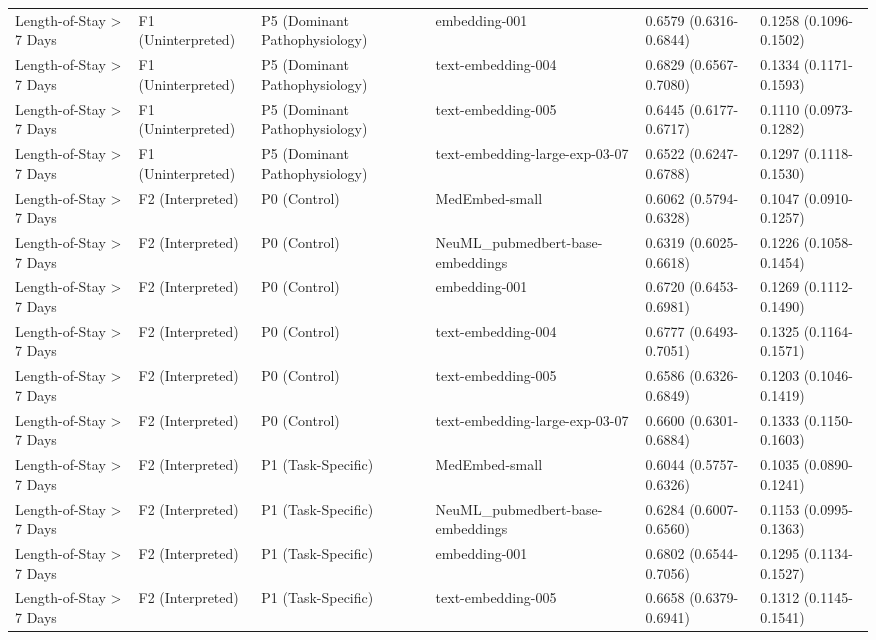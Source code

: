 \documentclass[border=0pt]{standalone}
\begin{document}
\begin{adjustbox}{width=\textwidth}
\begin{tabular}{llllll}
Length-of-Stay \textgreater{} 7 Days & F1 (Uninterpreted) & P5 (Dominant Pathophysiology) & embedding-001 & 0.6579 (0.6316-0.6844) & 0.1258 (0.1096-0.1502) \\
Length-of-Stay \textgreater{} 7 Days & F1 (Uninterpreted) & P5 (Dominant Pathophysiology) & text-embedding-004 & 0.6829 (0.6567-0.7080) & 0.1334 (0.1171-0.1593) \\
Length-of-Stay \textgreater{} 7 Days & F1 (Uninterpreted) & P5 (Dominant Pathophysiology) & text-embedding-005 & 0.6445 (0.6177-0.6717) & 0.1110 (0.0973-0.1282) \\
Length-of-Stay \textgreater{} 7 Days & F1 (Uninterpreted) & P5 (Dominant Pathophysiology) & text-embedding-large-exp-03-07 & 0.6522 (0.6247-0.6788) & 0.1297 (0.1118-0.1530) \\
Length-of-Stay \textgreater{} 7 Days & F2 (Interpreted) & P0 (Control) & MedEmbed-small & 0.6062 (0.5794-0.6328) & 0.1047 (0.0910-0.1257) \\
Length-of-Stay \textgreater{} 7 Days & F2 (Interpreted) & P0 (Control) & NeuML\_pubmedbert-base-embeddings & 0.6319 (0.6025-0.6618) & 0.1226 (0.1058-0.1454) \\
Length-of-Stay \textgreater{} 7 Days & F2 (Interpreted) & P0 (Control) & embedding-001 & 0.6720 (0.6453-0.6981) & 0.1269 (0.1112-0.1490) \\
Length-of-Stay \textgreater{} 7 Days & F2 (Interpreted) & P0 (Control) & text-embedding-004 & 0.6777 (0.6493-0.7051) & 0.1325 (0.1164-0.1571) \\
Length-of-Stay \textgreater{} 7 Days & F2 (Interpreted) & P0 (Control) & text-embedding-005 & 0.6586 (0.6326-0.6849) & 0.1203 (0.1046-0.1419) \\
Length-of-Stay \textgreater{} 7 Days & F2 (Interpreted) & P0 (Control) & text-embedding-large-exp-03-07 & 0.6600 (0.6301-0.6884) & 0.1333 (0.1150-0.1603) \\
Length-of-Stay \textgreater{} 7 Days & F2 (Interpreted) & P1 (Task-Specific) & MedEmbed-small & 0.6044 (0.5757-0.6326) & 0.1035 (0.0890-0.1241) \\
Length-of-Stay \textgreater{} 7 Days & F2 (Interpreted) & P1 (Task-Specific) & NeuML\_pubmedbert-base-embeddings & 0.6284 (0.6007-0.6560) & 0.1153 (0.0995-0.1363) \\
Length-of-Stay \textgreater{} 7 Days & F2 (Interpreted) & P1 (Task-Specific) & embedding-001 & 0.6802 (0.6544-0.7056) & 0.1295 (0.1134-0.1527) \\
Length-of-Stay \textgreater{} 7 Days & F2 (Interpreted) & P1 (Task-Specific) & text-embedding-005 & 0.6658 (0.6379-0.6941) & 0.1312 (0.1145-0.1541) \\

\end{tabular}
\end{adjustbox}
\end{document}
